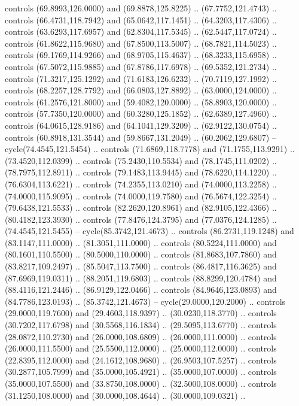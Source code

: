   controls (69.8993,126.0000) and (69.8878,125.8225) .. (67.7752,121.4743) ..
  controls (66.4731,118.7942) and (65.0642,117.1451) .. (64.3203,117.4306) ..
  controls (63.6293,117.6957) and (62.8304,117.5345) .. (62.5447,117.0724) ..
  controls (61.8622,115.9680) and (67.8500,113.5007) .. (68.7821,114.5023) ..
  controls (69.1769,114.9266) and (68.9705,115.4637) .. (68.3233,115.6958) ..
  controls (67.5072,115.9885) and (67.8786,117.6978) .. (69.5352,121.2734) ..
  controls (71.3217,125.1292) and (71.6183,126.6232) .. (70.7119,127.1992) ..
  controls (68.2257,128.7792) and (66.0803,127.8892) .. (63.0000,124.0000) ..
  controls (61.2576,121.8000) and (59.4082,120.0000) .. (58.8903,120.0000) ..
  controls (57.7350,120.0000) and (60.3280,125.1852) .. (62.6389,127.4960) ..
  controls (64.0615,128.9186) and (64.1041,129.3209) .. (62.9122,130.0754) ..
  controls (60.8918,131.3544) and (59.8667,131.2049) .. (60.2062,129.6807) --
  cycle(74.4545,121.5454) .. controls (71.6869,118.7778) and (71.1755,113.9291)
  .. (73.4520,112.0399) .. controls (75.2430,110.5534) and (78.1745,111.0202) ..
  (78.7975,112.8911) .. controls (79.1483,113.9445) and (78.6220,114.1220) ..
  (76.6304,113.6221) .. controls (74.2355,113.0210) and (74.0000,113.2258) ..
  (74.0000,115.9095) .. controls (74.0000,119.7580) and (76.5674,122.3254) ..
  (79.6438,121.5533) .. controls (82.2620,120.8961) and (82.9105,122.4366) ..
  (80.4182,123.3930) .. controls (77.8476,124.3795) and (77.0376,124.1285) ..
  (74.4545,121.5455) -- cycle(85.3742,121.4673) .. controls (86.2731,119.1248)
  and (83.1147,111.0000) .. (81.3051,111.0000) .. controls (80.5224,111.0000)
  and (80.1601,110.5500) .. (80.5000,110.0000) .. controls (81.8683,107.7860)
  and (83.8217,109.2497) .. (85.5047,113.7500) .. controls (86.4817,116.3625)
  and (87.6969,119.0311) .. (88.2051,119.6803) .. controls (88.8299,120.4784)
  and (88.4116,121.2446) .. (86.9129,122.0466) .. controls (84.9646,123.0893)
  and (84.7786,123.0193) .. (85.3742,121.4673) -- cycle(29.0000,120.2000) ..
  controls (29.0000,119.7600) and (29.4603,118.9397) .. (30.0230,118.3770) ..
  controls (30.7202,117.6798) and (30.5568,116.1834) .. (29.5095,113.6770) ..
  controls (28.0872,110.2730) and (26.0000,108.6809) .. (26.0000,111.0000) ..
  controls (26.0000,111.5500) and (25.5500,112.0000) .. (25.0000,112.0000) ..
  controls (22.8395,112.0000) and (24.1612,108.9680) .. (26.9503,107.5257) ..
  controls (30.2877,105.7999) and (35.0000,105.4921) .. (35.0000,107.0000) ..
  controls (35.0000,107.5500) and (33.8750,108.0000) .. (32.5000,108.0000) ..
  controls (31.1250,108.0000) and (30.0000,108.4644) .. (30.0000,109.0321) ..
